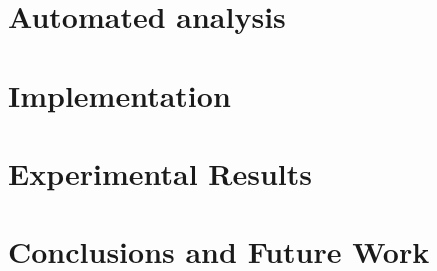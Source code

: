 \documentclass[a4paper,12pt,twoside,final]{book}
\theoremstyle{definition}
\begin{document}
	\chapter{Automated analysis}
		\label{chap:automated-analysis}
		
	\chapter{Implementation}
		\label{chap:implem}
		
	\chapter{Experimental Results}
		\label{chap:results}
		
	\chapter{Conclusions and Future Work}
		\label{chap:conclusion}
		


	\clearpage
	
	
	\nocite{*}

\end{document}
